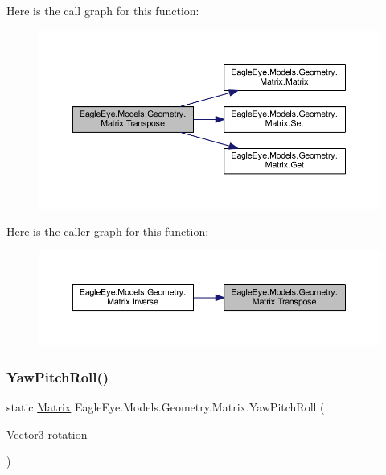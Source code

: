Here is the call graph for this function\+:\nopagebreak
\begin{figure}[H]
\begin{center}
\leavevmode
\includegraphics[width=350pt]{class_eagle_eye_1_1_models_1_1_geometry_1_1_matrix_ac0d40e692ec3157a7fc034a3b01447e5_cgraph}
\end{center}
\end{figure}
Here is the caller graph for this function\+:\nopagebreak
\begin{figure}[H]
\begin{center}
\leavevmode
\includegraphics[width=350pt]{class_eagle_eye_1_1_models_1_1_geometry_1_1_matrix_ac0d40e692ec3157a7fc034a3b01447e5_icgraph}
\end{center}
\end{figure}
\mbox{\label{class_eagle_eye_1_1_models_1_1_geometry_1_1_matrix_a7d060933c0b5d60c2cc161a21555515e}} 
\subsubsection{\texorpdfstring{YawPitchRoll()}{YawPitchRoll()}}
{\footnotesize\ttfamily static \mbox{\hyperlink{class_eagle_eye_1_1_models_1_1_geometry_1_1_matrix}{Matrix}} Eagle\+Eye.\+Models.\+Geometry.\+Matrix.\+Yaw\+Pitch\+Roll (\begin{DoxyParamCaption}\item[{\mbox{\hyperlink{struct_eagle_eye_1_1_models_1_1_geometry_1_1_vector3}{Vector3}}}]{rotation }\end{DoxyParamCaption})\hspace{0.3cm}{\ttfamily [static]}}

